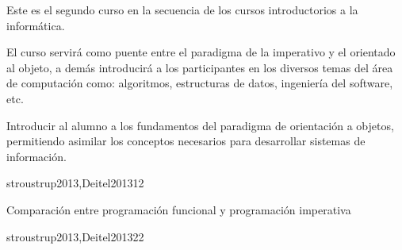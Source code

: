 
\begin{syllabus}


\begin{justification}
Este es el segundo curso en la secuencia de los cursos introductorios a la informática.

El curso servirá como puente entre el paradigma de la imperativo y el orientado al objeto, a demás introducirá a los participantes en los diversos temas del área de computación como: algoritmos, estructuras de datos, ingeniería del software, etc.
\end{justification}

\begin{goals}
\item Introducir al alumno a los fundamentos del paradigma de
      orientación a objetos, permitiendo asimilar los conceptos
      necesarios para desarrollar  sistemas de información.
\end{goals}

\begin{outcomes}
\end{outcomes}

\begin{unit}{\PLOverviewDef}{stroustrup2013,Deitel2013}{1}{2}
   \begin{topics}
      \item \PLOverviewTopicBrief
      \item Comparación entre programación funcional y programación imperativa
      \item \PLOverviewTopicHistory
   \end{topics}

   \begin{unitgoals}
      \item \PLOverviewObjONE
      \item \PLOverviewObjTWO
      \item \PLOverviewObjTHREE
   \end{unitgoals}
\end{unit}

\begin{unit}{\PLVirtualMachinesDef}{stroustrup2013,Deitel2013}{2}{2}
   \begin{topics}
      \item \PLVirtualMachinesTopicETheconcept%
      \item \PLVirtualMachinesTopicHierarchy%
      \item \PLVirtualMachinesTopicIntermediate%
   \end{topics}


\end{unit}
\end{syllabus}
